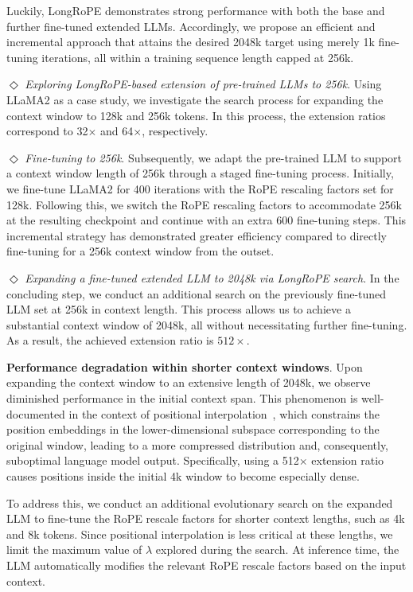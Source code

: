 Luckily, LongRoPE demonstrates strong performance with both the base and further fine-tuned extended LLMs. Accordingly, we propose an efficient and incremental approach that attains the desired 2048k target using merely 1k fine-tuning iterations, all within a training sequence length capped at 256k.

$\Diamond$ \textit{Exploring LongRoPE-based extension of pre-trained LLMs to 256k}. Using LLaMA2 as a case study, we investigate the search process for expanding the context window to 128k and 256k tokens. In this process, the extension ratios correspond to 32$\times$ and 64$\times$, respectively.

$\Diamond$ \textit{Fine-tuning to 256k}. Subsequently, we adapt the pre-trained LLM to support a context window length of 256k through a staged fine-tuning process. Initially, we fine-tune LLaMA2 for 400 iterations with the RoPE rescaling factors set for 128k. Following this, we switch the RoPE rescaling factors to accommodate 256k at the resulting checkpoint and continue with an extra 600 fine-tuning steps. This incremental strategy has demonstrated greater efficiency compared to directly fine-tuning for a 256k context window from the outset.

$\Diamond$ \textit{Expanding a fine-tuned extended LLM to 2048k via LongRoPE search}. In the concluding step, we conduct an additional search on the previously fine-tuned LLM set at 256k in context length. This process allows us to achieve a substantial context window of 2048k, all without necessitating further fine-tuning. As a result, the achieved extension ratio is $512\times$.

\textbf{Performance degradation within shorter context windows}. Upon expanding the context window to an extensive length of 2048k, we observe diminished performance in the initial context span. This phenomenon is well-documented in the context of positional interpolation~\cite{pi}, which constrains the position embeddings in the lower-dimensional subspace corresponding to the original window, leading to a more compressed distribution and, consequently, suboptimal language model output. Specifically, using a 512$\times$ extension ratio causes positions inside the initial 4k window to become especially dense.

To address this, we conduct an additional evolutionary search on the expanded LLM to fine-tune the RoPE rescale factors for shorter context lengths, such as 4k and 8k tokens. Since positional interpolation is less critical at these lengths, we limit the maximum value of $\lambda$ explored during the search. At inference time, the LLM automatically modifies the relevant RoPE rescale factors based on the input context.

